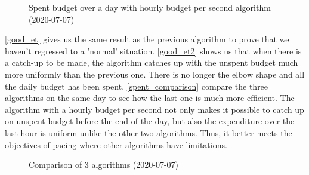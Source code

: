 \documentclass[12pt]{article}
\begin{document}
\begin{figure}[h!]
	\centering
	\vspace{-.7cm}
	\caption{Spent budget over a day with hourly budget per second algorithm (2020-07-07)}
	\label{good_et2}
\end{figure}

\autoref{good_et} gives us the same result as the previous algorithm to prove that we haven't regressed to a 'normal' situation. \autoref{good_et2} shows us that when there is a catch-up to be made, the algorithm catches up with the unspent budget much more uniformly than the previous one. There is no longer the elbow shape and all the daily budget has been spent. \autoref{spent_comparison} compare the three algorithms on the same day to see how the last one is much more efficient. The algorithm with a hourly budget per second not only makes it possible to catch up on unspent budget before the end of the day, but also the expenditure over the last hour is uniform unlike the other two algorithms. Thus, it better meets the objectives of pacing where other algorithms have limitations.

\begin{figure}[h!]
	\centering
	\vspace{-.7cm}
	\caption{Comparison of 3 algorithms (2020-07-07)}
	\label{spent_comparison}
\end{figure}
\end{document}
